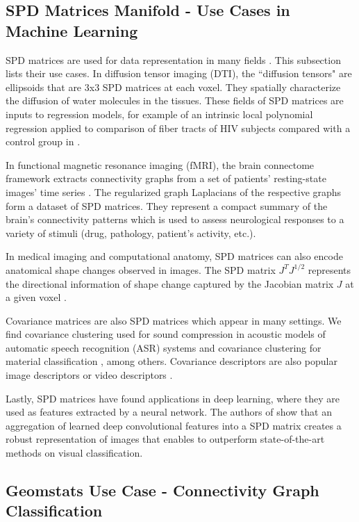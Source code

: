 \documentclass{article}
\begin{document}
\subsection{SPD Matrices Manifold - Use Cases in Machine Learning}

SPD matrices are used for data representation in many fields \cite{Cherian2016}. This subsection lists their use cases. In diffusion tensor imaging (DTI), the ``diffusion tensors" are ellipsoids that are 3x3 SPD matrices at each voxel. They spatially characterize the diffusion of water molecules in the tissues. These fields of SPD matrices are inputs to regression models, for example of an intrinsic local polynomial regression applied to comparison of fiber tracts of HIV subjects compared with a control group in \cite{Yuan2012}. 

In functional magnetic resonance imaging (fMRI), the brain connectome framework extracts connectivity graphs from a set of patients' resting-state images' time series \cite{sporns2005human,wang2013disrupted,ingalhalikar2014sex}. The regularized graph Laplacians of the respective graphs form a dataset of SPD matrices. They represent a compact summary of the brain's connectivity patterns which is used to assess neurological responses to a variety of stimuli (drug, pathology, patient's activity, etc.). 

In medical imaging and computational anatomy, SPD matrices can also encode anatomical shape changes observed in images. The SPD matrix $J^{T}J^{1/2}$ represents the directional information of shape change captured by the Jacobian matrix $J$ at a given voxel \cite{Grenander2007}. 
 
Covariance matrices are also SPD matrices which appear in many settings. We find covariance clustering used for sound compression in acoustic models of automatic speech recognition (ASR) systems \cite{Shinohara2010} and covariance clustering for material classification \cite{Faraki2015}, among others. Covariance descriptors are also popular image descriptors or video descriptors \cite{Harandi2014}. 

Lastly, SPD matrices have found applications in deep learning, where they are used as features extracted by a neural network. The authors of \cite{Gao2017} show that an aggregation of learned deep convolutional features into a SPD matrix creates a robust representation of images that enables to outperform state-of-the-art methods on visual classification.

\subsection{Geomstats Use Case - Connectivity Graph Classification}\label{sec:spd}
\end{document}
